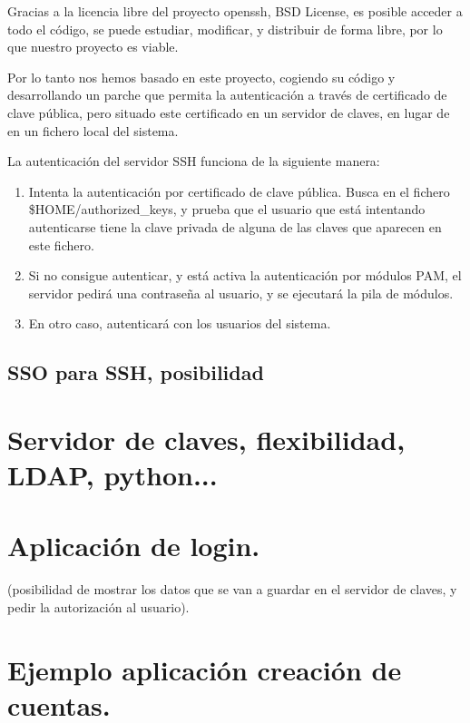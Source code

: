     Gracias a la licencia libre del proyecto openssh, BSD License, es
    posible acceder a todo el código, se puede estudiar, modificar, y
    distribuir de forma libre, por lo que nuestro proyecto es viable.

    Por lo tanto nos hemos basado en este proyecto, cogiendo su código y
    desarrollando un parche que permita la autenticación a través de
    certificado de clave pública, pero situado este certificado en un
    servidor de claves, en lugar de en un fichero local del sistema.

    La autenticación del servidor SSH funciona de la siguiente manera:

    \begin{enumerate}

    \item Intenta la autenticación por certificado de clave pública. Busca
    en el fichero \$HOME/authorized\_keys, y prueba que el usuario que está
    intentando autenticarse tiene la clave privada de alguna de las claves
    que aparecen en este fichero.

    \item Si no consigue autenticar, y está activa la autenticación por
    módulos PAM, el servidor pedirá una contraseña al usuario, y se
    ejecutará la pila de módulos.

    \item En otro caso, autenticará con los usuarios del sistema.

    \end{enumerate}


        \subsection{SSO para SSH, posibilidad}
    
    \section{Servidor de claves, flexibilidad, LDAP, python...}
    
    \section{Aplicación de login.}
     (posibilidad de mostrar los datos que se van a guardar en el servidor
     de claves, y pedir la autorización al usuario).

    \section{Ejemplo aplicación creación de cuentas.}
